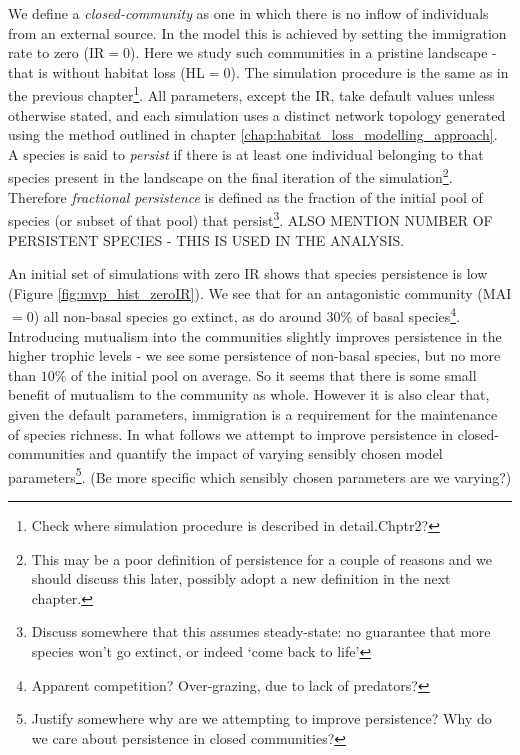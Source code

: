 We define a \emph{closed-community} as one in which there is no inflow of individuals from an external source. In the model this is achieved by setting the immigration rate to zero (IR$=0$). Here we study such communities in a pristine landscape - that is without habitat loss (HL$=0$). The simulation procedure is the same as in the previous chapter\footnote{Check where simulation procedure is described in detail.Chptr2?}. All parameters, except the IR, take default values unless otherwise stated, and each simulation uses a distinct network topology generated using the method outlined in chapter \ref{chap:habitat_loss_modelling_approach}. A species is said to \emph{persist} if there is at least one individual belonging to that species present in the landscape on the final iteration of the simulation\footnote{This may be a poor definition of persistence for a couple of reasons and we should discuss this later, possibly adopt a new definition in the next chapter.}. Therefore \emph{fractional persistence} is defined as the fraction of the initial pool of species (or subset of that pool) that persist\footnote{Discuss somewhere that this assumes steady-state: no guarantee that more species won't go extinct, or indeed `come back to life'}. ALSO MENTION NUMBER OF PERSISTENT SPECIES - THIS IS USED IN THE ANALYSIS.

An initial set of simulations with zero IR shows that species persistence is low (Figure \ref{fig:mvp_hist_zeroIR}). We see that for an antagonistic community (MAI$=0$) all non-basal species go extinct, as do around $30\%$ of basal species\footnote{Apparent competition? Over-grazing, due to lack of predators?}. Introducing mutualism into the communities slightly improves persistence in the higher trophic levels - we see some persistence of non-basal species, but no more than $10\%$ of the initial pool on average. So it seems that there is some small benefit of mutualism to the community as whole. However it is also clear that, given the default parameters, immigration is a requirement for the maintenance of species richness. In what follows we attempt to improve persistence in closed-communities and quantify the impact of varying sensibly chosen model parameters\footnote{Justify somewhere why are we attempting to improve persistence? Why do we care about persistence in closed communities?}. (Be more specific which sensibly chosen parameters are we varying?)

